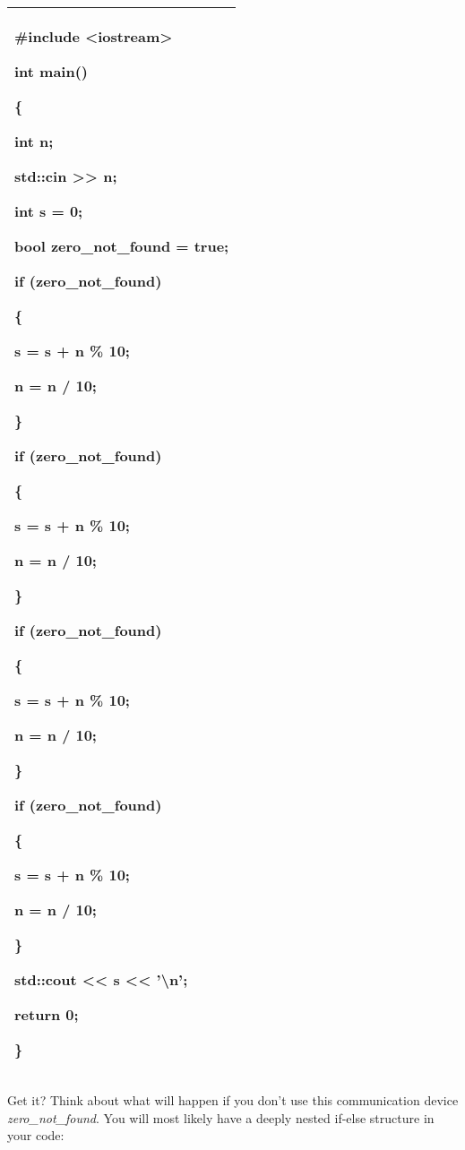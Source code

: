 \documentclass[
]{article}
\begin{document}
\begin{longtable}[]{@{}l@{}}
\toprule
\endhead
\begin{minipage}[t]{0.97\columnwidth}\raggedright
\#include \textless iostream\textgreater{}

int main()

\{

int n;

std::cin \textgreater\textgreater{} n;

int s = 0;

bool zero\_not\_found = true;

if (zero\_not\_found)

\{

s = s + n \% 10;

n = n / 10;

\}

if (zero\_not\_found)

\{

s = s + n \% 10;

n = n / 10;

\}

if (zero\_not\_found)

\{

s = s + n \% 10;

n = n / 10;

\}

if (zero\_not\_found)

\{

s = s + n \% 10;

n = n / 10;

\}

std::cout \textless\textless{} s \textless\textless{}
'\textbackslash n';

return 0;

\}\strut
\end{minipage}\tabularnewline
\bottomrule
\end{longtable}

Get it? Think about what will happen if you don't use this communication
device \emph{zero\_not\_found}. You will most likely have a deeply
nested if-else structure in your code:
\end{document}
